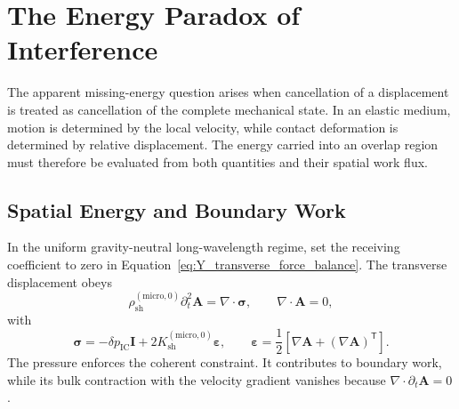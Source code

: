 \section{The Energy Paradox of Interference}

The apparent missing-energy question arises when cancellation of a displacement is treated as cancellation of the complete mechanical state. In an elastic medium, motion is determined by the local velocity, while contact deformation is determined by relative displacement. The energy carried into an overlap region must therefore be evaluated from both quantities and their spatial work flux.

\subsection{Spatial Energy and Boundary Work}

In the uniform gravity-neutral long-wavelength regime, set the receiving coefficient to zero in Equation~\eqref{eq:Y_transverse_force_balance}. The transverse displacement obeys
\begin{equation}
    \rho_{\mathrm{sh}}^{(\mathrm{micro},0)}\partial_t^2\mathbf A
    =\nabla\cdot\boldsymbol\sigma,
    \qquad \nabla\cdot\mathbf A=0,
\end{equation}
with
\begin{equation}
    \boldsymbol\sigma
    =-\delta p_{\mathrm{IC}}\mathbf I
    +2K_{\mathrm{sh}}^{(\mathrm{micro},0)}\boldsymbol\varepsilon,
    \qquad
    \boldsymbol\varepsilon
    =\frac12\left[\nabla\mathbf A+(\nabla\mathbf A)^{\mathsf T}\right].
\end{equation}
The pressure enforces the coherent constraint. It contributes to boundary work, while its bulk contraction with the velocity gradient vanishes because $\nabla\cdot\partial_t\mathbf A=0$.

